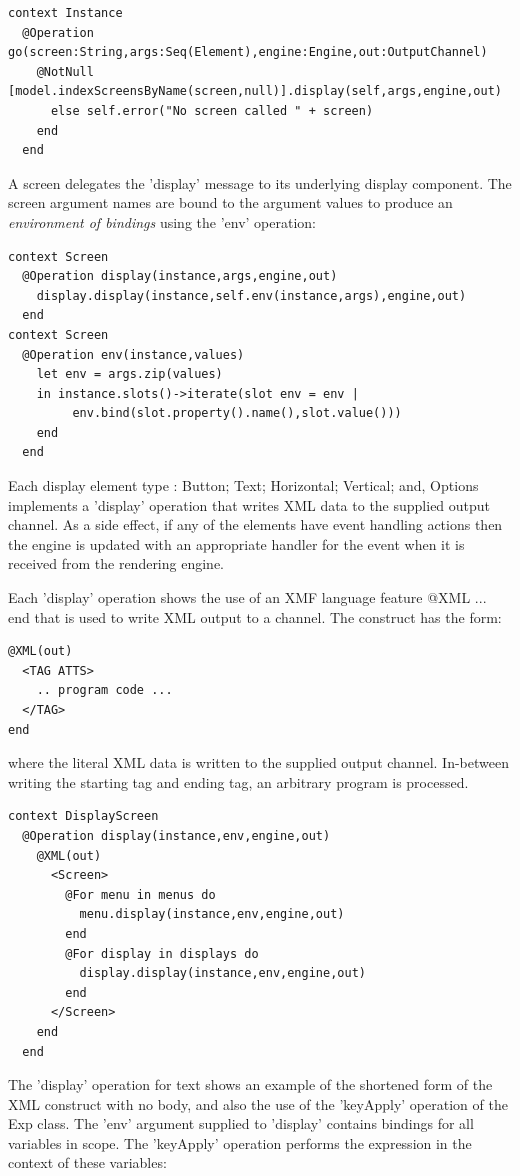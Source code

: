 \begin{lstlisting}
context Instance
  @Operation go(screen:String,args:Seq(Element),engine:Engine,out:OutputChannel)
    @NotNull [model.indexScreensByName(screen,null)].display(self,args,engine,out)
      else self.error("No screen called " + screen)
    end
  end
\end{lstlisting}A screen delegates the 'display' message to its underlying display
component. The screen argument names are bound to the argument values
to produce an \emph{environment of bindings} using the 'env' operation:

\begin{lstlisting}
context Screen
  @Operation display(instance,args,engine,out)
    display.display(instance,self.env(instance,args),engine,out)
  end
context Screen    
  @Operation env(instance,values)
    let env = args.zip(values)
    in instance.slots()->iterate(slot env = env | 
         env.bind(slot.property().name(),slot.value()))
    end
  end
\end{lstlisting}Each display element type : Button; Text; Horizontal; Vertical; and,
Options implements a 'display' operation that writes XML data to the
supplied output channel. As a side effect, if any of the elements
have event handling actions then the engine is updated with an appropriate
handler for the event when it is received from the rendering engine.

Each 'display' operation shows the use of an XMF language feature
@XML ... end that is used to write XML output to a channel. The construct
has the form:

\begin{lstlisting}
@XML(out)
  <TAG ATTS>
    .. program code ...
  </TAG>
end
\end{lstlisting}where the literal XML data is written to the supplied output channel.
In-between writing the starting tag and ending tag, an arbitrary program
is processed.

\begin{lstlisting}
context DisplayScreen
  @Operation display(instance,env,engine,out)
    @XML(out)
      <Screen>
        @For menu in menus do
          menu.display(instance,env,engine,out)
        end
        @For display in displays do
          display.display(instance,env,engine,out)
        end
      </Screen>
    end
  end
\end{lstlisting}The 'display' operation for text shows an example of the shortened
form of the XML construct with no body, and also the use of the 'keyApply'
operation of the Exp class. The 'env' argument supplied to 'display'
contains bindings for all variables in scope. The 'keyApply' operation
performs the expression in the context of these variables:

